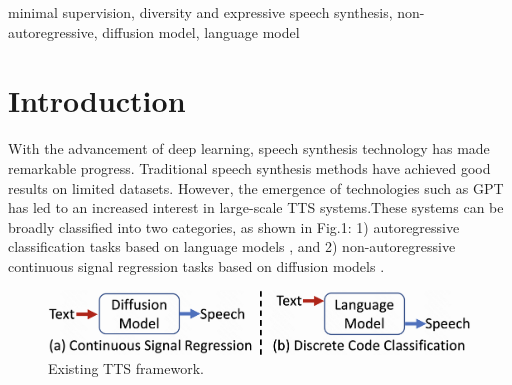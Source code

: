 \documentclass{article}
\begin{document}
%

\renewcommand{\thefootnote}{\fnsymbol{footnote}} %

\begin{keywords}
minimal supervision, diversity and expressive speech synthesis, non-autoregressive, diffusion model, language model
\end{keywords}
%
\section{Introduction}
\label{sec:intro}
With the advancement of deep learning, speech synthesis technology has made remarkable progress. Traditional speech synthesis methods have achieved good results on limited datasets\cite{wang2017tacotron,arik2017deep, li2019neural,ren2019fastspeech, kim2020glow, elias2021parallel}. However, the emergence of technologies such as GPT \cite{radford2018improving, brown2020language} has led to an increased interest in large-scale TTS systems.These systems can be broadly classified into two categories, as shown in Fig.1: 1) autoregressive classification tasks based on language models \cite{borsos2022audiolm, wang2023neural,zhang2023speak,kharitonov2023speak}, and 2) non-autoregressive continuous signal regression tasks based on diffusion models \cite{levkovitch2022zero, shen2023naturalspeech, le2023voicebox}.

\begin{figure}[t]
 \centering
 \includegraphics[width=\linewidth]{compare.png}
  \vspace{-15pt}
  \captionsetup{belowskip=-20pt}
 \caption{Existing TTS framework.}
 \label{fig:proposed_model}
\end{figure}
\end{document}
